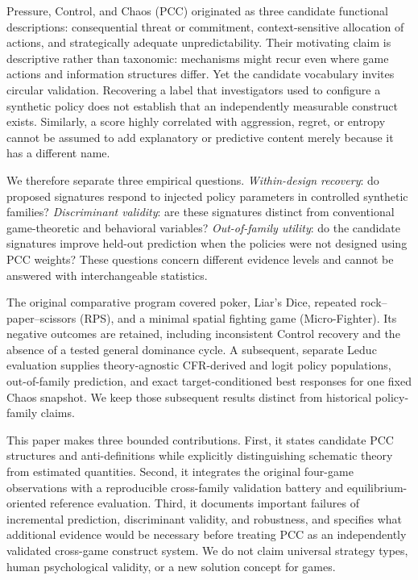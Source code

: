 \documentclass[journal]{IEEEtran}
\begin{document}
Pressure, Control, and Chaos (PCC) originated as three candidate functional descriptions: consequential threat or commitment, context-sensitive allocation of actions, and strategically adequate unpredictability. Their motivating claim is descriptive rather than taxonomic: mechanisms might recur even where game actions and information structures differ. Yet the candidate vocabulary invites circular validation. Recovering a label that investigators used to configure a synthetic policy does not establish that an independently measurable construct exists. Similarly, a score highly correlated with aggression, regret, or entropy cannot be assumed to add explanatory or predictive content merely because it has a different name.

We therefore separate three empirical questions. \emph{Within-design recovery}: do proposed signatures respond to injected policy parameters in controlled synthetic families? \emph{Discriminant validity}: are these signatures distinct from conventional game-theoretic and behavioral variables? \emph{Out-of-family utility}: do the candidate signatures improve held-out prediction when the policies were not designed using PCC weights? These questions concern different evidence levels and cannot be answered with interchangeable statistics.

The original comparative program covered poker, Liar's Dice, repeated rock--paper--scissors (RPS), and a minimal spatial fighting game (Micro-Fighter). Its negative outcomes are retained, including inconsistent Control recovery and the absence of a tested general dominance cycle. A subsequent, separate Leduc evaluation supplies theory-agnostic CFR-derived and logit policy populations, out-of-family prediction, and exact target-conditioned best responses for one fixed Chaos snapshot. We keep those subsequent results distinct from historical policy-family claims.

This paper makes three bounded contributions. First, it states candidate PCC structures and anti-definitions while explicitly distinguishing schematic theory from estimated quantities. Second, it integrates the original four-game observations with a reproducible cross-family validation battery and equilibrium-oriented reference evaluation. Third, it documents important failures of incremental prediction, discriminant validity, and robustness, and specifies what additional evidence would be necessary before treating PCC as an independently validated cross-game construct system. We do not claim universal strategy types, human psychological validity, or a new solution concept for games.
\end{document}
